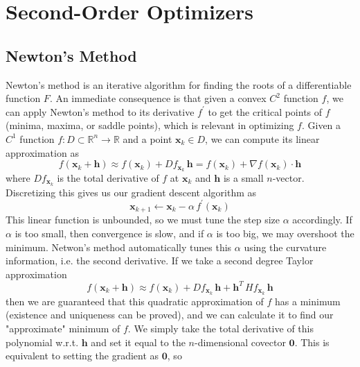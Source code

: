 \section{Second-Order Optimizers} 

\subsection{Newton's Method}

  Newton's method is an iterative algorithm for finding the roots of a differentiable function $F$. An immediate consequence is that given a convex $C^2$ function $f$, we can apply Newton's method to its derivative $f^\prime$ to get the critical points of $f$ (minima, maxima, or saddle points), which is relevant in optimizing $f$. Given a $C^1$ function $f: D \subset \mathbb{R}^n \longrightarrow \mathbb{R}$ and a point $\mathbf{x}_k \in D$, we can compute its linear approximation as 
  \begin{equation}
    f(\mathbf{x}_k + \mathbf{h}) \approx f(\mathbf{x}_k) + D f_{\mathbf{x}_k} \, \mathbf{h} = f(\mathbf{x}_k) + \nabla f(\mathbf{x}_k) \cdot \mathbf{h}
  \end{equation}
  where $D f_{\mathbf{x}_k}$ is the total derivative of $f$ at $\mathbf{x}_k$ and $\mathbf{h}$ is a small $n$-vector. Discretizing this gives us our gradient descent algorithm as 
  \begin{equation}
    \mathbf{x}_{k+1} \gets \mathbf{x}_k - \alpha \, f^\prime(\mathbf{x}_k)
  \end{equation}
  This linear function is unbounded, so we must tune the step size $\alpha$ accordingly. If $\alpha$ is too small, then convergence is slow, and if $\alpha$ is too big, we may overshoot the minimum. Netwon's method automatically tunes this $\alpha$ using the curvature information, i.e. the second derivative. If we take a second degree Taylor approximation 
  \begin{equation}
    f(\mathbf{x}_k + \mathbf{h}) \approx f(\mathbf{x}_k) + D f_{\mathbf{x}_k} \, \mathbf{h} + \mathbf{h}^T \, H f_{\mathbf{x}_k} \, \mathbf{h}
  \end{equation}
  then we are guaranteed that this quadratic approximation of $f$ has a minimum (existence and uniqueness can be proved), and we can calculate it to find our "approximate" minimum of $f$. We simply take the total derivative of this polynomial w.r.t. $\mathbf{h}$ and set it equal to the $n$-dimensional covector $\mathbf{0}$. This is equivalent to setting the gradient as $\mathbf{0}$, so 
